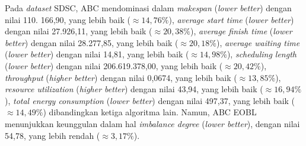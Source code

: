 Pada \textit{dataset} SDSC, ABC mendominasi dalam \textit{makespan} (\textit{lower better}) dengan nilai 110. 166,90, yang lebih baik ($\approx 14,76\%$), \textit{average start time} (\textit{lower better}) dengan nilai 27.926,11, yang lebih baik ($\approx 20,38\%$), \textit{average finish time} (\textit{lower better}) dengan nilai 28.277,85, yang lebih baik ($\approx 20,18\%$), \textit{average waiting time} (\textit{lower better}) dengan nilai 14,81, yang lebih baik ($\approx 14,98\%$), \textit{scheduling length} (\textit{lower better}) dengan nilai 206.619.378,00, yang lebih baik ($\approx 20,42\%$), \textit{throughput} (\textit{higher better}) dengan nilai 0,0674, yang lebih baik ($\approx 13,85\%$), \textit{resource utilization} (\textit{higher better}) dengan nilai 43,94, yang lebih baik ($\approx 16,94\%$), \textit{total energy consumption} (\textit{lower better}) dengan nilai 497,37, yang lebih baik ($\approx 14,49\%$) dibandingkan ketiga algoritma lain. Namun, ABC EOBL menunjukkan keunggulan dalam hal \textit{imbalance degree} (\textit{lower better}), dengan nilai 54,78, yang lebih rendah ($\approx 3,17\%$).